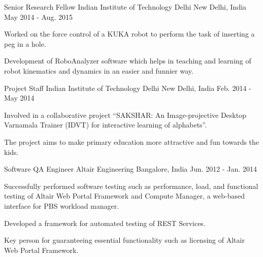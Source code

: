 

\begin{cventries}

  \cventry
    {Senior Research Fellow} %
    {Indian Institute of Technology Delhi} %
    {New Delhi, India} %
    {May 2014 - Aug. 2015} %
    {
      \begin{cvitems} %
        \item {Worked on the force control of a KUKA robot to perform the task of inserting a peg in a hole.}
        \item {Development of RoboAnalyzer software which helps in teaching and learning of robot kinematics and dynamics in an easier and funnier way.}
      \end{cvitems}
    }

  \cventry
    {Project Staff} %
    {Indian Institute of Technology Delhi} %
    {New Delhi, India} %
    {Feb. 2014 - May 2014} %
    {
      \begin{cvitems} %
        \item {Involved in a collaborative project ``SAKSHAR: An Image-projective Desktop Varnamala Trainer (IDVT) for interactive learning of alphabets''.}
        \item {The project aims to make primary education more attractive and fun towards the kids.}
      \end{cvitems}
    }

  \cventry
    {Software QA Engineer} %
    {Altair Engineering} %
    {Bangalore, India} %
    {Jun. 2012 - Jan. 2014} %
    {
      \begin{cvitems} %
        \item {Successfully performed software testing such as performance, load, and functional testing of Altair Web Portal Framework and Compute Manager, a web-based interface for PBS workload manager.}
        \item {Developed a framework for automated testing of REST Services.}
        \item {Key person for guaranteeing essential functionality such as licensing of Altair Web Portal Framework.}
      \end{cvitems}
    }

\end{cventries}

